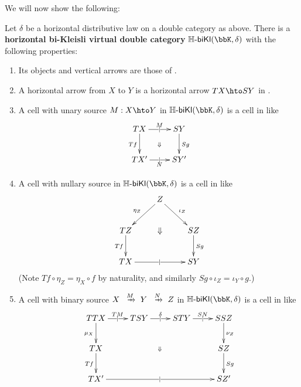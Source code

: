 \documentclass{amsart}
\newcommand{\K}{\bbK}
\newcommand{\Hbikl}[2]{\mathbb{H}\text{-}\mathsf{biKl}(#1,#2)}
\begin{document}
We will now show the following:

\begin{thm}
  Let $\delta$ be a horizontal distributive law on a double category as above.
  There is a \textbf{horizontal bi-Kleisli virtual double category} $\Hbikl{\K}{\delta}$ with the following properties:
  \begin{enumerate}
  \item Its objects and vertical arrows are those of \bbK.
  \item A horizontal arrow from $X$ to $Y$ is a horizontal arrow $T X \hto S Y$ in \bbK.
  \item A cell with unary source $M:X\hto Y$ in $\Hbikl\K\delta$ is a cell in \K like
    \[ \xymatrix{ T X \ar[r]|{|}^{M} \ar[d]_{Tf} \ar@{}[dr]|{\Downarrow} & S Y \ar[d]^{Sg}\\
      T X' \ar[r]|{|}_{N} & S Y' } \]
  \item A cell with nullary source in $\Hbikl\K\delta$ is a cell in \bbK like
    \[ \xymatrix{ & Z \ar[dl]_{\eta_Z} \ar[dr]^{\iota_Z} \\
      T Z \ar[d]_{T f} & \Downarrow & S Z \ar[d]^{S g} \\
      T X \ar[rr]|{|} && S Y } \]
    (Note $T f \circ \eta_Z = \eta_X \circ f$ by naturality, and similarly $S g \circ \iota_Z = \iota_Y \circ g$.)
  \item A cell with binary source $X\xhto{M} Y \xhto{N} Z$ in $\Hbikl\K\delta$ is a cell in \bbK like\label{item:hbikl-binary}
    \[ \xymatrix{ TTX \ar[r]|{|}^{T M} \ar[d]_{\mu_X} \ar@{}[ddrrr]|{\Downarrow} &
      T S Y \ar[r]|{|}^{\delta} & S T Y \ar[r]|{|}^{S N} & S S Z \ar[d]^{\nu_Z}\\
      T X \ar[d]_{T f} &&& S Z \ar[d]^{S g}\\
      T X' \ar[rrr]|{|} &&& S Z'}\]
  \end{enumerate}
\end{thm}
\end{document}
